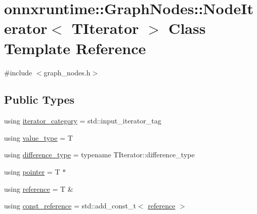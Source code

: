 \hypertarget{classonnxruntime_1_1GraphNodes_1_1NodeIterator}{}\section{onnxruntime\+:\+:Graph\+Nodes\+:\+:Node\+Iterator$<$ T\+Iterator $>$ Class Template Reference}
\label{classonnxruntime_1_1GraphNodes_1_1NodeIterator}


{\ttfamily \#include $<$graph\+\_\+nodes.\+h$>$}

\subsection*{Public Types}
\begin{DoxyCompactItemize}
\item 
using \mbox{\hyperlink{classonnxruntime_1_1GraphNodes_1_1NodeIterator_a3debcf3ca756298db3bc63b741516fb8}{iterator\+\_\+category}} = std\+::input\+\_\+iterator\+\_\+tag
\item 
using \mbox{\hyperlink{classonnxruntime_1_1GraphNodes_1_1NodeIterator_ace084d92e9afa50a4e42e40832255a4e}{value\+\_\+type}} = T
\item 
using \mbox{\hyperlink{classonnxruntime_1_1GraphNodes_1_1NodeIterator_a583f317796564f91b8d1cd11a8b8a74f}{difference\+\_\+type}} = typename T\+Iterator\+::difference\+\_\+type
\item 
using \mbox{\hyperlink{classonnxruntime_1_1GraphNodes_1_1NodeIterator_a66c0579aa9dea456843a9017aeae3600}{pointer}} = T $\ast$
\item 
using \mbox{\hyperlink{classonnxruntime_1_1GraphNodes_1_1NodeIterator_ad66278df7151f4ed78d6191f3483e435}{reference}} = T \&
\item 
using \mbox{\hyperlink{classonnxruntime_1_1GraphNodes_1_1NodeIterator_ac0484990a78d9725abe1adfa1b4eb476}{const\+\_\+reference}} = std\+::add\+\_\+const\+\_\+t$<$ \mbox{\hyperlink{classonnxruntime_1_1GraphNodes_1_1NodeIterator_ad66278df7151f4ed78d6191f3483e435}{reference}} $>$
\end{DoxyCompactItemize}

